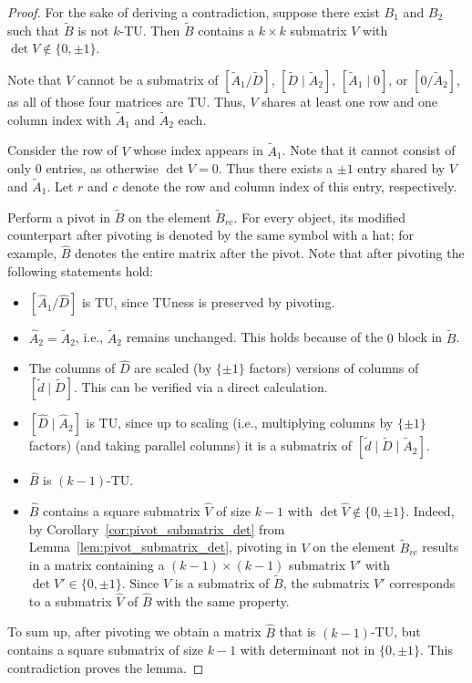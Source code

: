 \documentclass{article}
\theoremstyle{definition}
\begin{document}
\begin{proof}
    For the sake of deriving a contradiction, suppose there exist $B_{1}$ and $B_{2}$ such that $\tilde{B}$ is not $k$-TU. Then $\tilde{B}$ contains a $k \times k$ submatrix $V$ with $\det V \notin \{0, \pm 1\}$.

    Note that $V$ cannot be a submatrix of $\left[\tilde{A}_{1} / \tilde{D}\right]$, $\left[\tilde{D} \mid \tilde{A}_{2}\right]$, $\left[\tilde{A}_{1} \mid 0\right]$, or $\left[0 / \tilde{A}_{2}\right]$, as all of those four matrices are TU. Thus, $V$ shares at least one row and one column index with $\tilde{A}_{1}$ and $\tilde{A}_{2}$ each.

    Consider the row of $V$ whose index appears in $\tilde{A}_{1}$. Note that it cannot consist of only $0$ entries, as otherwise $\det V = 0$. Thus there exists a $\pm 1$ entry shared by $V$ and $\tilde{A}_{1}$. Let $r$ and $c$ denote the row and column index of this entry, respectively.

    Perform a pivot in $\tilde{B}$ on the element $\tilde{B}_{rc}$. For every object, its modified counterpart after pivoting is denoted by the same symbol with a hat; for example, $\hat{B}$ denotes the entire matrix after the pivot. Note that after pivoting the following statements hold:

    \begin{itemize}
        \item $\left[\hat{A}_{1} / \hat{D}\right]$ is TU, since TUness is preserved by pivoting.
        \item $\hat{A}_{2} = \tilde{A}_{2}$, i.e., $\tilde{A}_{2}$ remains unchanged. This holds because of the $0$ block in $\tilde{B}$.
        \item The columns of $\hat{D}$ are scaled (by $\{\pm 1\}$ factors) versions of columns of $[\tilde{d} \mid \tilde{D}]$. This can be verified via a direct calculation. 
        \item $\left[\hat{D} \mid \hat{A}_{2}\right]$ is TU, since up to scaling (i.e., multiplying columns by $\{\pm 1\}$ factors) (and taking parallel columns) it is a submatrix of $[\tilde{d} \mid \tilde{D} \mid \tilde{A}_{2}]$.
        \item $\hat{B}$ is $(k - 1)$-TU. 
        \item $\hat{B}$ contains a square submatrix $\hat{V}$ of size $k - 1$ with $\det \hat{V} \notin \{0, \pm 1\}$. Indeed, by Corollary~\ref{cor:pivot_submatrix_det} from Lemma~\ref{lem:pivot_submatrix_det}, pivoting in $V$ on the element $\tilde{B}_{rc}$ results in a matrix containing a $(k - 1) \times (k - 1)$ submatrix $V'$ with $\det V' \in \{0, \pm 1\}$. Since $V$ is a submatrix of $\tilde{B}$, the submatrix $V'$ corresponds to a submatrix $\hat{V}$ of $\hat{B}$ with the same property.
    \end{itemize}
    To sum up, after pivoting we obtain a matrix $\hat{B}$ that is $(k - 1)$-TU, but contains a square submatrix of size $k - 1$ with determinant not in $\{0, \pm 1\}$. This contradiction proves the lemma.
\end{proof}
\end{document}
